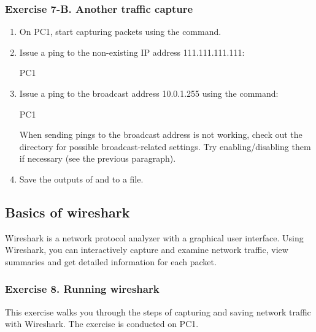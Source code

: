 \subsubsection*{Exercise 7-B. Another  traffic capture}
\begin{enumerate}
	\item On PC1, start capturing packets using the  command.
	\item Issue a ping to the non-existing IP address 111.111.111.111:
		\begin{cmdblock}
	PC1%
		\end{cmdblock}
	\item Issue a ping to the broadcast address 10.0.1.255 using the command:
		\begin{cmdblock}
	PC1%
		\end{cmdblock}
		When sending pings to the broadcast address is not working, check out the  directory for possible broadcast-related settings. Try enabling/disabling them if necessary (see the previous paragraph).
	\item Save the outputs of  and  to a file.
\end{enumerate}

\begin{questions}
\end{questions}

\newpage
\subsection{Basics of wireshark}

Wireshark is a network protocol analyzer with a graphical user interface. Using Wireshark, you can interactively capture and examine network traffic, view summaries and get detailed information for each packet.

\subsubsection*{Exercise 8. Running wireshark}

This exercise walks you through the steps of capturing and saving network traffic with Wireshark. The exercise is conducted on PC1.

